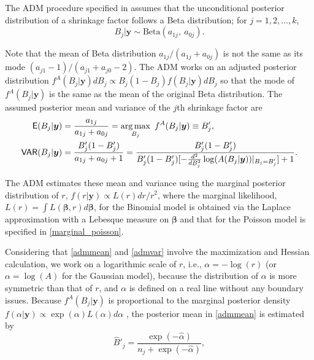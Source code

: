 \documentclass[article]{jss}
\DeclareMathOperator*{\argmax}{arg\,max}
\begin{document}
The ADM procedure specified in \cite{tang2011} assumes that the unconditional posterior distribution of a shrinkage factor follows a Beta distribution; for $j=1, 2, \ldots, k$,
\begin{equation}\label{admshrinkage}
B_j\vert\boldsymbol{y}\sim \textrm{Beta}(a_{1j},~ a_{0j}).
\end{equation}


Note that the mean of Beta distribution $a_{1j}/(a_{1j}+a_{0j})$ is not the same as its mode $(a_{j1}-1)/(a_{j1}+a_{j0}-2)$. The ADM works on an adjusted posterior distribution $f^A(B_j\vert \boldsymbol{y})dB_j\propto B_j(1-B_j)f(B_j\vert \boldsymbol{y})dB_j$ so that the mode of $f^A(B_j\vert \boldsymbol{y})$ is the same as the mean of the original Beta distribution. The assumed posterior mean and variance of the $j$th shrinkage factor are
\begin{align}
\E(B_j\vert\boldsymbol{y})&=\frac{a_{1j}}{a_{1j}+a_{0j}}=\argmax_{B_j}~ f^A(B_j\vert \boldsymbol{y})\equiv B'_j,\label{admmean}\\
\VAR(B_j\vert\boldsymbol{y})&=\frac{B'_j(1-B'_j)}{a_{1j}+a_{0j}+1}=\frac{B'_j(1-B'_j)}{B'_j(1-B'_j)[-\frac{d^2}{dB^2_j}\log(A(B_j\vert \boldsymbol{y}))\vert_{B_j=B'_j}] +1}.\label{admvar}
\end{align}

The ADM estimates these mean and variance using the marginal posterior distribution of $r$, $f(r\vert\boldsymbol{y})\propto L(r)dr/r^2$, where the marginal likelihood, $L(r)=\int L(\boldsymbol{\beta}, r)d\boldsymbol{\beta}$, for the Binomial model is obtained via the Laplace approximation with a Lebesque measure on $\boldsymbol{\beta}$ and that for the Poisson model is specified in  \eqref{marginal_poisson}. %

Considering that  \eqref{admmean} and  \eqref{admvar} involve the maximization and Hessian calculation, we work on a logarithmic scale of $r$, i.e., $\alpha=-\log(r)$ (or $\alpha=\log(A)$ for the Gaussian model), because the distribution of $\alpha$ is more symmetric than that of $r$, and $\alpha$ is defined on a real line without any boundary issues. Because $f^A(B_j\vert\boldsymbol{y})$ is proportional to the marginal posterior density $f(\alpha\vert\boldsymbol{y})\propto \exp(\alpha) L(\alpha)d\alpha$ \citep{tang2011}, the  posterior mean in  \eqref{admmean} is estimated by
\begin{equation}\label{meaninvariance}
\hat{B}'_j=\frac{\exp(-\hat{\alpha})}{n_j+\exp(-\hat{\alpha})},
\end{equation}
\end{document}
